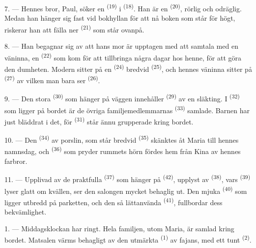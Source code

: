 \VUsaut{5.0mm}
\VUsaut{3.0mm}

7. --- Hennes bror, Paul, söker en  \textsuperscript{(19)} i
 \textsuperscript{(18)}. Han är en 
\textsuperscript{(20)}, rörlig och odräglig. Medan han hänger sig fast vid bokhyllan för att
nå boken som står för högt, riskerar han att fälla ner
 \textsuperscript{(21)} som står ovanpå.

8. --- Han begagnar sig av att hans mor är upptagen med att samtala med en väninna, en
 \textsuperscript{(22)} som kom för att tillbringa några dagar hos henne, för att
göra den dumheten. Modern sitter på en
 \textsuperscript{(24)} bredvid 
\textsuperscript{(25)}, och hennes väninna sitter på  \textsuperscript{(27)} av
vilken man bara ser  \textsuperscript{(26)}.

9. --- Den stora  \textsuperscript{(30)} som hänger på väggen innehåller
 \textsuperscript{(29)} av en släkting. I
 \textsuperscript{(32)} som ligger på bordet är de övriga
familjemedlemmarnas  \textsuperscript{(33)} samlade. Barnen har just
bläddrat i det, för  \textsuperscript{(31)} står ännu grupperade kring
bordet.

10. --- Den  \textsuperscript{(34)} av porslin, som står bredvid
 \textsuperscript{(35)} skänktes åt Maria till hennes namnsdag, och
 \textsuperscript{(36)} som pryder rummets hörn fördes hem från Kina av hennes
farbror.

11. --- Upplivad av de praktfulla  \textsuperscript{(37)} som hänger på
 \textsuperscript{(42)}, upplyst av
 \textsuperscript{(38)}, vars 
\textsuperscript{(39)} lyser glatt om kvällen, ser den salongen mycket behaglig ut. Den mjuka
 \textsuperscript{(40)} som ligger utbredd på parketten, och den så lättanvända
 \textsuperscript{(41)}, fullbordar dess bekvämlighet.

\VUsaut{3.6mm}
\VUsaut{3.0mm}

1. --- Middagsklockan har ringt. Hela familjen, utom Maria, är samlad kring bordet. Matsalen
värms behagligt av den utmärkta  \textsuperscript{(1)} av fajans, med ett tunt
 \textsuperscript{(2)}.

